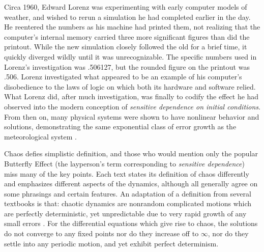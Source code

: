 \documentclass[12pt,twoside]{reedthesis}
\begin{document}

Circa 1960, Edward Lorenz was experimenting with early computer models of weather, and wished to rerun a simulation he had completed earlier in the day.  He reentered the numbers as his machine had printed them, not realizing that the computer's internal memory carried three more significant figures than did the printout.  While the new simulation closely followed the old for a brief time, it quickly diverged wildly until it was unrecognizable.  The specific numbers used in Lorenz's investigation was .506127, but the rounded figure on the printout was .506.  Lorenz investigated what appeared to be an example of his computer's disobedience to the laws of logic on which both its hardware and software relied.  What Lorenz did, after much investigation, was finally to codify the effect he had observed into the modern conception of \textit{sensitive dependence on initial conditions}.  From then on, many physical systems were shown to have nonlinear behavior and solutions, demonstrating the same exponential class of error growth as the meteorological system \cite{lorenz1963}.  




Chaos defies simplistic definition, and those who would mention only the popular Butterfly Effect (the layperson's term corresponding to \textit{sensitive dependence}) miss many of the key points.  Each text states its definition of chaos differently and emphasizes different aspects of the dynamics, although all generally agree on some phrasings and certain features.  An adaptation of a definition from several textbooks is that: chaotic dynamics are nonrandom complicated motions which are perfectly deterministic, yet unpredictable due to very rapid growth of any small errors \cite{peitgen2004} \cite{strogatz1994}.  For the differential equations which give rise to chaos, the solutions do not converge to any fixed points nor do they increase off to $\infty$, nor do they settle into any periodic motion, and yet exhibit perfect determinism.  
\end{document}
